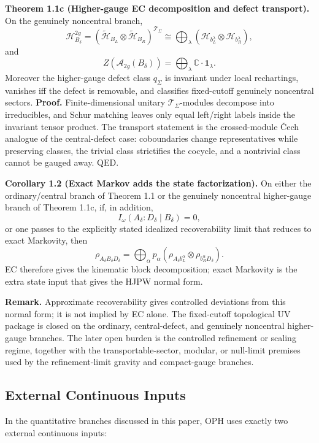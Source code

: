 \textbf{Theorem 1.1c (Higher-gauge EC decomposition and defect transport).} On the genuinely noncentral branch,
\[
\mathcal H_{B_\delta}^{2g}
=
(\tilde{\mathcal H}_{B_L}\otimes \tilde{\mathcal H}_{B_R})^{\mathcal T_\Sigma}
\cong
\bigoplus_\lambda
(\mathcal H_{b_L^\lambda}\otimes \mathcal H_{b_R^\lambda}),
\]
and
\[
Z(\mathcal A_{2g}(B_\delta))
=
\bigoplus_\lambda \mathbb C\cdot \mathbf 1_\lambda.
\]
Moreover the higher-gauge defect class \(q_\Sigma\) is invariant under local rechartings, vanishes iff the defect is removable, and classifies fixed-cutoff genuinely noncentral sectors.
\textbf{Proof.} Finite-dimensional unitary \(\mathcal T_\Sigma\)-modules decompose into
irreducibles, and Schur matching leaves only equal left/right labels inside the invariant tensor
product. The transport statement is the crossed-module \v{C}ech analogue of the central-defect
case: coboundaries change representatives while preserving classes, the trivial class strictifies
the cocycle, and a nontrivial class cannot be gauged away. QED.

\textbf{Corollary 1.2 (Exact Markov adds the state factorization).} On either the ordinary/central branch of Theorem 1.1 or the genuinely noncentral higher-gauge branch of Theorem 1.1c, if, in addition,
\[
I_\omega(A_\delta:D_\delta\mid B_\delta)=0,
\]
or one passes to the explicitly stated idealized recoverability limit that reduces to exact Markovity, then
\[
\rho_{A_\delta B_\delta D_\delta}
=
\bigoplus_\alpha p_\alpha
\left(\rho_{A_\delta b_L^\alpha}\otimes \rho_{b_R^\alpha D_\delta}\right).
\]
EC therefore gives the kinematic block decomposition; exact Markovity is the extra state input that gives the HJPW normal form.

\textbf{Remark.} Approximate recoverability gives controlled deviations from this normal form; it is not implied by EC alone. The fixed-cutoff topological UV package is closed on the ordinary, central-defect, and genuinely noncentral higher-gauge branches. The later open burden is the controlled refinement or scaling regime, together with the transportable-sector, modular, or null-limit premises used by the refinement-limit gravity and compact-gauge branches.
\subsection{External Continuous Inputs}\label{14-fundamental-parameters}

In the quantitative branches discussed in this paper, OPH uses exactly two external continuous inputs:

